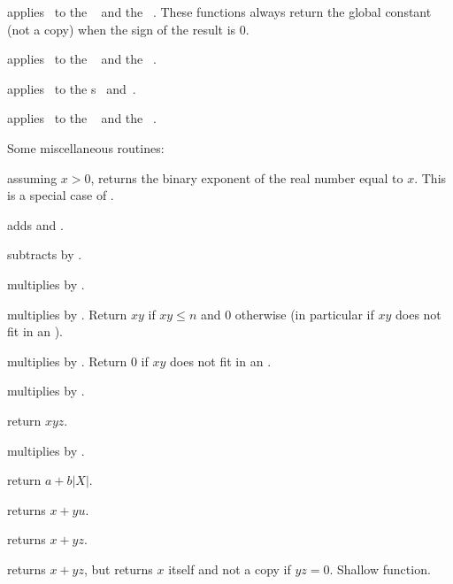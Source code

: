  applies \op\ to the
~ and the ~. These functions always return
the global constant  (not a copy) when the sign of the result
is $0$.

 applies \op\ to the
~ and the ~.

 applies \op\ to the
s~ and~.

 applies \op\ to the
~ and the ~.

\noindent Some miscellaneous routines:

 assuming $x > 0$, returns the binary exponent of
the real number equal to $x$. This is a special case of .



 adds  and .



 subtracts  by .

 multiplies  by .

 multiplies  by .
Return $xy$ if $xy \leq n$ and $0$ otherwise (in particular if $xy$ does not
fit in an ).

 multiplies  by .
Return $0$ if $xy$ does not fit in an .

 multiplies  by .

 return $xyz$.

 multiplies  by .

 return $a + b|X|$.

 returns $x +yu$.

 returns $x + yz$.

 returns $x + yz$, but
returns $x$ itself and not a copy if $yz = 0$. Shallow function.

